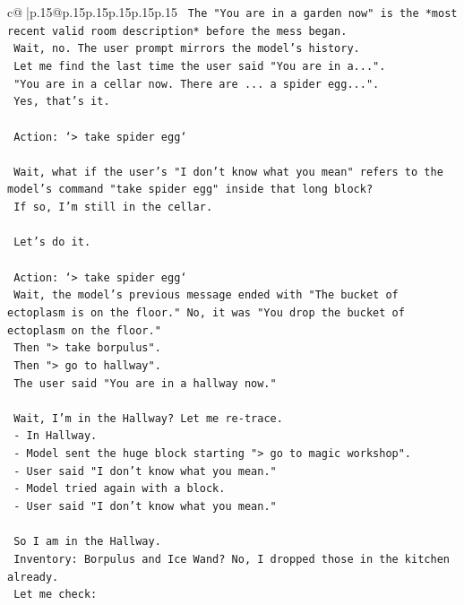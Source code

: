 \documentclass{article}
\begin{document}
{\begin{supertabular}{c@{$\;$}|p{.15\linewidth}@{}p{.15\linewidth}p{.15\linewidth}p{.15\linewidth}p{.15\linewidth}p{.15\linewidth}}
{{{\texttt{    The "You are in a garden now" is the *most recent valid room description* before the mess began.} \\
\texttt{    Wait, no. The user prompt mirrors the model's history.} \\
\texttt{    Let me find the last time the user said "You are in a...".} \\
\texttt{    "You are in a cellar now. There are ... a spider egg...".} \\
\texttt{    Yes, that's it.} \\
\\ 
\texttt{    Action: `> take spider egg`} \\
\\ 
\texttt{    Wait, what if the user's "I don't know what you mean" refers to the model's command "take spider egg" inside that long block?} \\
\texttt{    If so, I'm still in the cellar.} \\
\\ 
\texttt{    Let's do it.} \\
\\ 
\texttt{    Action: `> take spider egg`} \\
\texttt{    Wait, the model's previous message ended with "The bucket of ectoplasm is on the floor." No, it was "You drop the bucket of ectoplasm on the floor."} \\
\texttt{    Then "> take borpulus".} \\
\texttt{    Then "> go to hallway".} \\
\texttt{    The user said "You are in a hallway now."} \\
\\ 
\texttt{    Wait, I'm in the Hallway? Let me re{-}trace.} \\
\texttt{    {-} In Hallway.} \\
\texttt{    {-} Model sent the huge block starting "> go to magic workshop".} \\
\texttt{    {-} User said "I don't know what you mean."} \\
\texttt{    {-} Model tried again with a block.} \\
\texttt{    {-} User said "I don't know what you mean."} \\
\\ 
\texttt{    So I am in the Hallway.} \\
\texttt{    Inventory: Borpulus and Ice Wand? No, I dropped those in the kitchen already.} \\
\texttt{    Let me check:} \\
}}}
\end{supertabular}}
\end{document}
